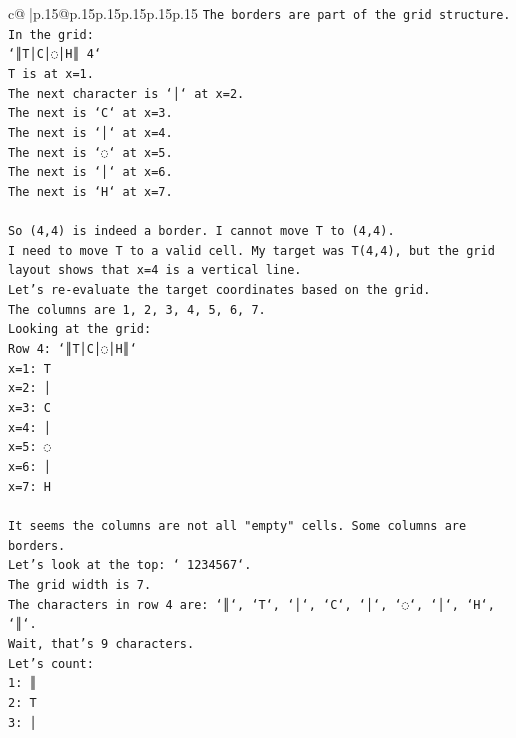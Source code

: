 \documentclass{article}
\begin{document}
{\begin{supertabular}{c@{$\;$}|p{.15\linewidth}@{}p{.15\linewidth}p{.15\linewidth}p{.15\linewidth}p{.15\linewidth}p{.15\linewidth}}
{{{\texttt{The borders are part of the grid structure.} \\
\texttt{In the grid:} \\
\texttt{`║T│C│◌│H║ 4`} \\
\texttt{T is at x=1.} \\
\texttt{The next character is `│` at x=2.} \\
\texttt{The next is `C` at x=3.} \\
\texttt{The next is `│` at x=4.} \\
\texttt{The next is `◌` at x=5.} \\
\texttt{The next is `│` at x=6.} \\
\texttt{The next is `H` at x=7.} \\
\\ 
\texttt{So (4,4) is indeed a border. I cannot move T to (4,4).} \\
\texttt{I need to move T to a valid cell. My target was T(4,4), but the grid layout shows that x=4 is a vertical line.} \\
\texttt{Let's re{-}evaluate the target coordinates based on the grid.} \\
\texttt{The columns are 1, 2, 3, 4, 5, 6, 7.} \\
\texttt{Looking at the grid:} \\
\texttt{Row 4: `║T│C│◌│H║`} \\
\texttt{x=1: T} \\
\texttt{x=2: │} \\
\texttt{x=3: C} \\
\texttt{x=4: │} \\
\texttt{x=5: ◌} \\
\texttt{x=6: │} \\
\texttt{x=7: H} \\
\\ 
\texttt{It seems the columns are not all "empty" cells. Some columns are borders.} \\
\texttt{Let's look at the top: ` 1234567`.} \\
\texttt{The grid width is 7.} \\
\texttt{The characters in row 4 are: `║`, `T`, `│`, `C`, `│`, `◌`, `│`, `H`, `║`.} \\
\texttt{Wait, that's 9 characters.} \\
\texttt{Let's count:} \\
\texttt{1: ║} \\
\texttt{2: T} \\
\texttt{3: │} \\
}}}
\end{supertabular}}
\end{document}
